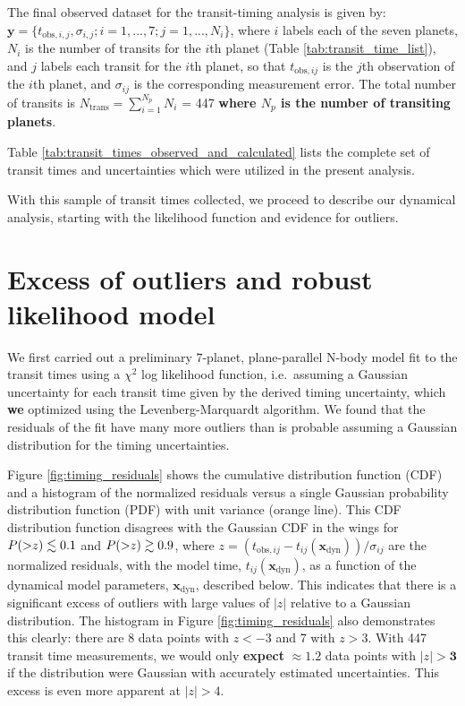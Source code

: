 \documentclass[twocolumn]{aastex63}
\begin{document}
The final observed dataset for the transit-timing analysis
is given by: $\mathbf{y} = \{t_{\mathrm{obs},i,j},\sigma_{i,j}; i=1,...,7; j = 1,...,N_i\}$, where $i$ labels each of the seven planets, $N_i$ is
the number of transits for the $i$th planet (Table \ref{tab:transit_time_list}),
and $j$ labels each transit for the $i$th planet, so that
$t_{\mathrm{obs},ij}$ is the $j$th observation of the $i$th planet, and
$\sigma_{ij}$ is the corresponding measurement error.  The total number of transits is $N_\mathrm{trans} = \sum_{i=1}^{N_p} N_i$ = 447 \textbf{where $N_p$ is the number of transiting planets}.

Table \ref{tab:transit_times_observed_and_calculated} lists the complete set
of transit times and uncertainties which were utilized in the present analysis.

With this sample of transit times collected, we proceed to describe our
dynamical analysis, starting with the likelihood function and evidence for outliers.

\section{Excess of outliers and robust likelihood model} \label{sec:outliers}

We first carried out a preliminary 7-planet, plane-parallel N-body model fit to the transit times using a $\chi^2$ log likelihood function, i.e.\ assuming a Gaussian uncertainty for each transit time given by the derived timing uncertainty, which \textbf{we} optimized using the Levenberg-Marquardt algorithm.
We found that the residuals of the fit have many more outliers than is probable assuming
a Gaussian distribution for the timing uncertainties.

Figure \ref{fig:timing_residuals} shows the cumulative distribution
function (CDF)
and a histogram of the normalized residuals versus a single Gaussian
probability distribution function (PDF) with unit variance (orange line).
This CDF distribution function disagrees with the Gaussian CDF
in the wings for $P({>}z) \lesssim 0.1$ and $P({>}z) \gtrsim 0.9$,
where $z {=} (t_{\mathrm{obs},ij} {-} t_{ij}(\mathbf{x}_\mathrm{dyn}))/\sigma_{ij}$ are the normalized residuals, with the model time, $t_{ij}(\mathbf{x}_\mathrm{dyn})$, as a function of the dynamical model parameters, $\mathbf{x}_\mathrm{dyn}$, described below.
This indicates that there is a significant excess of outliers with
large values of $\vert z\vert$
relative to a Gaussian distribution.  The histogram in Figure
\ref{fig:timing_residuals} also demonstrates this clearly:  there
are 8 data points with $z {<} -3$ and 7 with $z {>} 3$.  With 447
transit time measurements, we would only \textbf{expect} $\approx 1.2$ data points
with $\vert z\vert {>} \mathbf{3}$ if the distribution were Gaussian with accurately estimated
uncertainties.  This excess is even more apparent at
$\vert z \vert {>} 4$. %
\end{document}
